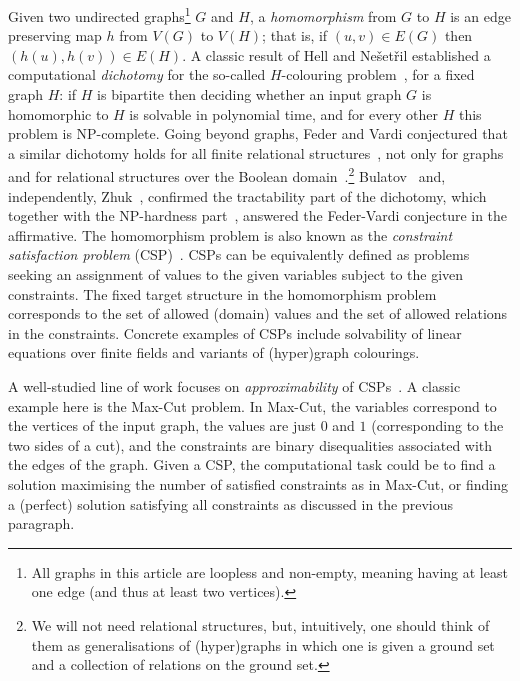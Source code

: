 \documentclass[a4paper,11pt, DIV=11]{scrartcl}
\theoremstyle{plain}
\theoremstyle{definition}
\begin{document}
Given two undirected graphs\footnote{All graphs in this article are loopless and
non-empty, meaning having at least one edge (and thus at least two vertices).}
$G$ and $H$, a \emph{homomorphism} from $G$ to $H$ is an edge preserving map $h$
from $V(G)$ to $V(H)$; that is, if $(u,v)\in E(G)$ then $(h(u),h(v))\in
E(H)$. A classic result of Hell and Ne\v{s}et\v{r}il established a computational
\emph{dichotomy} for the so-called $H$-colouring
problem~\cite{Hell90:h-coloring}, for a fixed graph $H$: if $H$ is bipartite then deciding whether an
input graph $G$ is homomorphic to $H$ is solvable in polynomial time, and for
every other $H$ this problem is NP-complete. Going beyond graphs, Feder and
Vardi conjectured that a similar dichotomy holds for all finite relational
structures~\cite{FederVardiConjecture}, not only for graphs and for relational structures over
the Boolean domain~\cite{Schaefer78:stoc}.\footnote{We will not need relational
structures, but, intuitively, one should think of them as generalisations of
(hyper)graphs in which one is given a ground set and a collection of relations
on the ground set.} Bulatov~\cite{Bulatov17:focs} and, independently,
Zhuk~\cite{Zhuk20:jacm}, confirmed the tractability part of the dichotomy, which
together with the NP-hardness part~\cite{Bulatov05:classifying}, answered the
Feder-Vardi conjecture in the affirmative. The homomorphism problem is also
known as the \emph{constraint satisfaction problem} (CSP)~\cite{Jeavons98:algebraic}. CSPs can be
equivalently defined as problems seeking an assignment of values to the
given variables subject to the given constraints. The fixed target structure in
the homomorphism problem corresponds to the set of allowed (domain) values and
the set of allowed relations in the constraints. Concrete examples of CSPs include
solvability of linear equations over finite fields and variants of (hyper)graph
colourings.

A well-studied line of work focuses on \emph{approximability} of
CSPs~\cite{KSTW00,Trevisan00:sicomp}. A classic example here is
the Max-Cut problem. In Max-Cut, the variables correspond to the
vertices of the input graph, the values are just $0$ and $1$ (corresponding to
the two sides of a cut), and the constraints are binary disequalities associated
with the edges of the graph. Given a CSP, the computational task could be to
find a solution maximising the number of satisfied constraints as in Max-Cut, or
finding a (perfect) solution satisfying all constraints as discussed in the
previous paragraph. 
\end{document}
